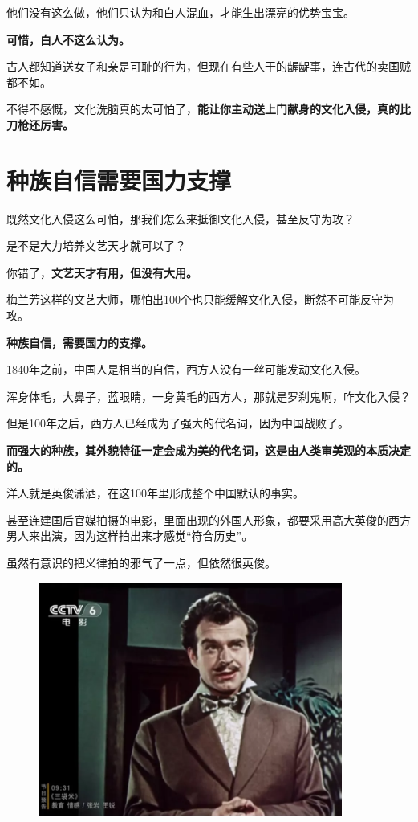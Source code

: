 \documentclass[UTF8, 11pt, oneside]{ctexart}
\newcommand{\zd}[1]{\textbf{\textcolor[RGB]{123,12,0}{#1}}} %
\newcommand{\biaoti}[1]{%
    \section*{#1}
}
\begin{document}
他们没有这么做，他们只认为和白人混血，才能生出漂亮的优势宝宝。

\zd{可惜，白人不这么认为。}

古人都知道送女子和亲是可耻的行为，但现在有些人干的龌龊事，连古代的卖国贼都不如。

不得不感慨，文化洗脑真的太可怕了，\zd{能让你主动送上门献身的文化入侵，真的比刀枪还厉害。}


\biaoti{种族自信需要国力支撑}

既然文化入侵这么可怕，那我们怎么来抵御文化入侵，甚至反守为攻？

是不是大力培养文艺天才就可以了？

你错了，\zd{文艺天才有用，但没有大用。}

梅兰芳这样的文艺大师，哪怕出100个也只能缓解文化入侵，断然不可能反守为攻。

\zd{种族自信，需要国力的支撑。}

1840年之前，中国人是相当的自信，西方人没有一丝可能发动文化入侵。

浑身体毛，大鼻子，蓝眼睛，一身黄毛的西方人，那就是罗刹鬼啊，咋文化入侵？

但是100年之后，西方人已经成为了强大的代名词，因为中国战败了。

\zd{而强大的种族，其外貌特征一定会成为美的代名词，这是由人类审美观的本质决定的。}

洋人就是英俊潇洒，在这100年里形成整个中国默认的事实。

甚至连建国后官媒拍摄的电影，里面出现的外国人形象，都要采用高大英俊的西方男人来出演，因为这样拍出来才感觉“符合历史”。

虽然有意识的把义律拍的邪气了一点，但依然很英俊。

\begin{figure}[H]
    \centering
    \includegraphics[width=10cm]{2023-09-06-008}
\end{figure}
\end{document}
